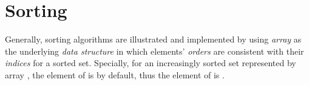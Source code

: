 \chapter{Sorting}

Generally, sorting algorithms are illustrated and implemented by using \emph{array} as the underlying \emph{data structure} in which elements' \emph{orders} are consistent with their \emph{indices} for a sorted set.
Specially, for an increasingly sorted set  represented by array , the  element of  is  by default, thus the  element of  is .



